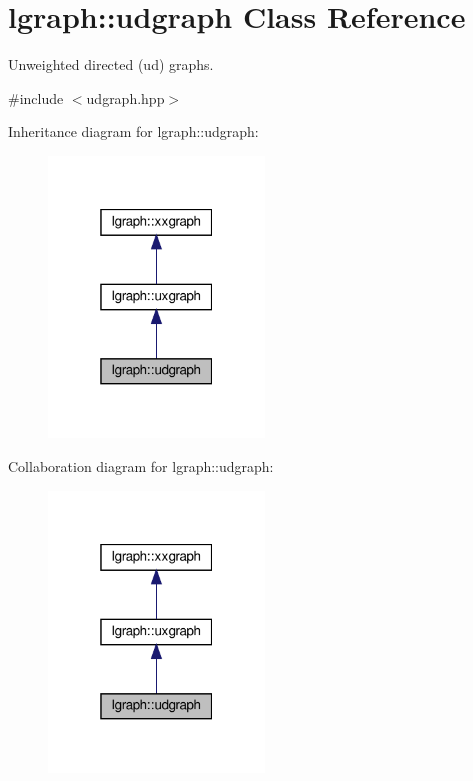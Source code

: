 \hypertarget{classlgraph_1_1udgraph}{}\section{lgraph\+:\+:udgraph Class Reference}
\label{classlgraph_1_1udgraph}


Unweighted directed (ud) graphs.  




{\ttfamily \#include $<$udgraph.\+hpp$>$}



Inheritance diagram for lgraph\+:\+:udgraph\+:\nopagebreak
\begin{figure}[H]
\begin{center}
\leavevmode
\includegraphics[width=163pt]{classlgraph_1_1udgraph__inherit__graph}
\end{center}
\end{figure}


Collaboration diagram for lgraph\+:\+:udgraph\+:\nopagebreak
\begin{figure}[H]
\begin{center}
\leavevmode
\includegraphics[width=163pt]{classlgraph_1_1udgraph__coll__graph}
\end{center}
\end{figure}
